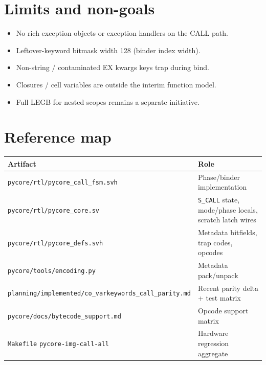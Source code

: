 \documentclass[11pt,a4paper]{article}
\begin{document}
\section{Limits and non-goals}

\begin{itemize}[leftmargin=*]
  \item No rich exception objects or exception handlers on the CALL path.
  \item Leftover-keyword bitmask width 128 (binder index width).
  \item Non-string / contaminated EX kwargs keys trap during bind.
  \item Closures / cell variables are outside the interim function model.
  \item Full LEGB for nested scopes remains a separate initiative.
\end{itemize}

\section{Reference map}

\begin{center}
\begin{tabular}{@{}lp{}@{}}
\toprule
Artifact & Role \\
\midrule
\texttt{pycore/rtl/pycore\_call\_fsm.svh} & Phase/binder implementation \\
\texttt{pycore/rtl/pycore\_core.sv} & \texttt{S\_CALL} state, mode/phase locals, scratch latch wires \\
\texttt{pycore/rtl/pycore\_defs.svh} & Metadata bitfields, trap codes, opcodes \\
\texttt{pycore/tools/encoding.py} & Metadata pack/unpack \\
\texttt{planning/implemented/co\_varkeywords\_call\_parity.md} & Recent parity delta + test matrix \\
\texttt{pycore/docs/bytecode\_support.md} & Opcode support matrix \\
\texttt{Makefile} \texttt{pycore-img-call-all} & Hardware regression aggregate \\
\bottomrule
\end{tabular}
\end{center}
\end{document}
